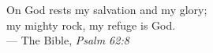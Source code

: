 \cleardoublepage
\thispagestyle{empty}


\vspace*{5cm}
\begin{raggedleft}
    On God rests my salvation and my glory;\\
    my mighty rock, my refuge is God.\\
     --- The Bible, \textit{Psalm 62:8}\\
\end{raggedleft}

\vspace{4cm}



